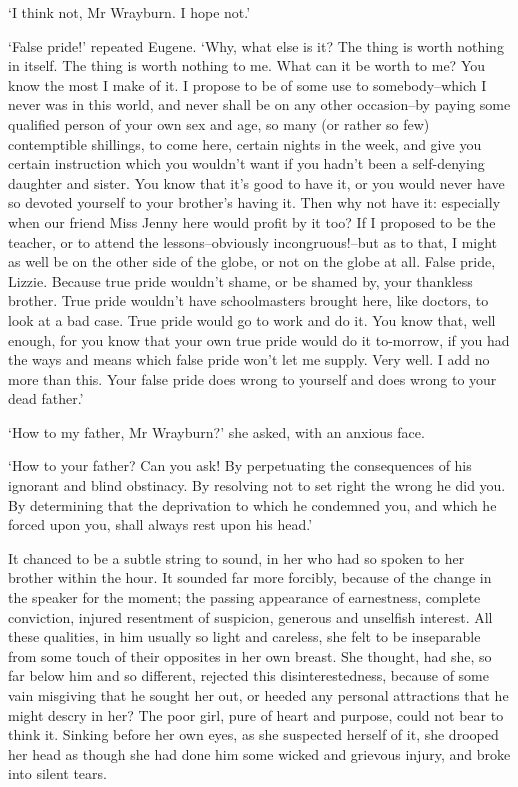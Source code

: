 ‘I think not, Mr Wrayburn. I hope not.’

‘False pride!’ repeated Eugene. ‘Why, what else is it? The thing is
worth nothing in itself. The thing is worth nothing to me. What can it
be worth to me? You know the most I make of it. I propose to be of some
use to somebody--which I never was in this world, and never shall be on
any other occasion--by paying some qualified person of your own sex and
age, so many (or rather so few) contemptible shillings, to come here,
certain nights in the week, and give you certain instruction which you
wouldn’t want if you hadn’t been a self-denying daughter and sister.
You know that it’s good to have it, or you would never have so devoted
yourself to your brother’s having it. Then why not have it: especially
when our friend Miss Jenny here would profit by it too? If I proposed to
be the teacher, or to attend the lessons--obviously incongruous!--but
as to that, I might as well be on the other side of the globe, or not
on the globe at all. False pride, Lizzie. Because true pride wouldn’t
shame, or be shamed by, your thankless brother. True pride wouldn’t have
schoolmasters brought here, like doctors, to look at a bad case. True
pride would go to work and do it. You know that, well enough, for you
know that your own true pride would do it to-morrow, if you had the ways
and means which false pride won’t let me supply. Very well. I add no
more than this. Your false pride does wrong to yourself and does wrong
to your dead father.’

‘How to my father, Mr Wrayburn?’ she asked, with an anxious face.

‘How to your father? Can you ask! By perpetuating the consequences of
his ignorant and blind obstinacy. By resolving not to set right the
wrong he did you. By determining that the deprivation to which he
condemned you, and which he forced upon you, shall always rest upon his
head.’

It chanced to be a subtle string to sound, in her who had so spoken to
her brother within the hour. It sounded far more forcibly, because of
the change in the speaker for the moment; the passing appearance of
earnestness, complete conviction, injured resentment of suspicion,
generous and unselfish interest. All these qualities, in him usually so
light and careless, she felt to be inseparable from some touch of their
opposites in her own breast. She thought, had she, so far below him
and so different, rejected this disinterestedness, because of some vain
misgiving that he sought her out, or heeded any personal attractions
that he might descry in her? The poor girl, pure of heart and purpose,
could not bear to think it. Sinking before her own eyes, as she
suspected herself of it, she drooped her head as though she had done him
some wicked and grievous injury, and broke into silent tears.

